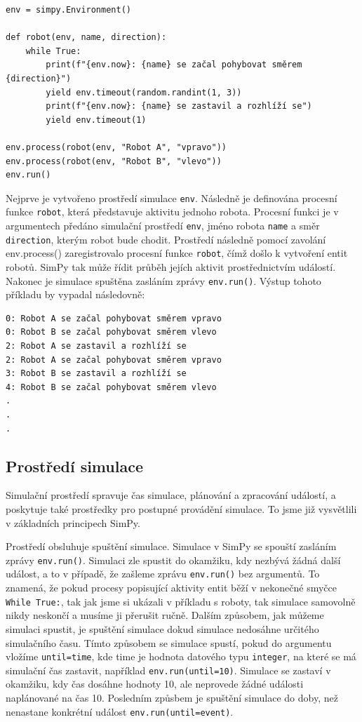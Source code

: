 \documentclass[12pt,a4paper]{article}
\begin{document}
 \begin{verbatim} 
env = simpy.Environment()

def robot(env, name, direction):
    while True:
        print(f"{env.now}: {name} se začal pohybovat směrem {direction}")
        yield env.timeout(random.randint(1, 3))
        print(f"{env.now}: {name} se zastavil a rozhlíží se")
        yield env.timeout(1)       

env.process(robot(env, "Robot A", "vpravo"))
env.process(robot(env, "Robot B", "vlevo"))
env.run()
\end{verbatim}

\noindent Nejprve je vytvořeno prostředí simulace \texttt{env}. Následně je definována procesní funkce \texttt{robot}, která představuje aktivitu jednoho robota. Procesní funkci je v argumentech předáno simulační prostředí \texttt{env}, jméno robota \texttt{name} a směr \texttt{direction}, kterým robot bude chodit. Prostředí následně pomocí zavolání env.process() zaregistrovalo procesní funkce \texttt{robot}, čímž došlo k vytvoření entit robotů. SimPy tak může řídit průběh jejích aktivit prostřednictvím událostí. Nakonec je simulace spuštěna zasláním zprávy \texttt{env.run()}. Výstup tohoto příkladu by vypadal následovně:

 \begin{verbatim} 
0: Robot A se začal pohybovat směrem vpravo
0: Robot B se začal pohybovat směrem vlevo
2: Robot A se zastavil a rozhlíží se
2: Robot A se začal pohybovat směrem vpravo
3: Robot B se zastavil a rozhlíží se
4: Robot B se začal pohybovat směrem vlevo
.
.
.
\end{verbatim}

\subsection{Prostředí simulace}
Simulační prostředí spravuje čas simulace, plánování a zpracování událostí, a poskytuje také prostředky pro postupné provádění simulace. To jsme již vysvětlili v základních principech SimPy. 

Prostředí obsluhuje spuštění simulace. Simulace v SimPy se spouští zasláním zprávy \texttt{env.run()}. Simulaci zle spustit do okamžiku, kdy nezbývá žádná další událost, a to v případě, že zašleme zprávu \texttt{env.run()} bez argumentů. To znamená, že pokud procesy popisující aktivity entit běží v nekonečné smyčce \texttt{While True:}, tak jak jsme si ukázali v příkladu s roboty, tak simulace samovolně nikdy neskončí a musíme ji přerušit ručně. Dalším způsobem, jak můžeme simulaci spustit, je spuštění simulace dokud simulace nedosáhne určitého simulačního času. Tímto způsobem se simulace spustí, pokud do argumentu vložíme \texttt{until=time}, kde time je hodnota datového typu \texttt{integer}, na které se má simulační čas zastavit, například  \texttt{env.run(until=10)}. Simulace se zastaví v okamžiku, kdy čas dosáhne hodnoty 10, ale neprovede žádné události naplánované na čas 10. Posledním způsbem je spuštění simulace do doby, než nenastane konkrétní událost \texttt{env.run(until=event)}. 
\end{document}
